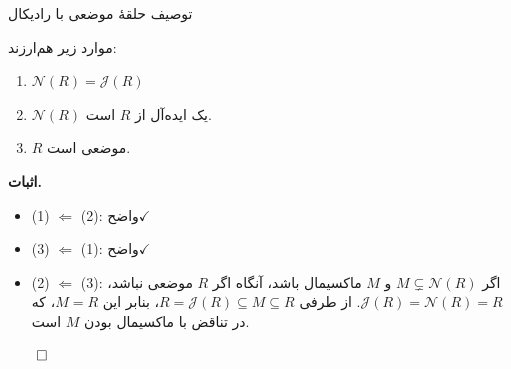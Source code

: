 \begin{frame}[t]{توصیف حلقهٔ موضعی با رادیکال}
    \begin{theorem}
        موارد زیر هم‌ارزند:
        \begin{enumerate}
            \item \(\mathcal{N}(R) = \mathcal{J}(R)\)
            \item \(\mathcal{N}(R)\) یک ایده‌آل از \(R\) است.
            \item \(R\) موضعی است.
        \end{enumerate}
    \end{theorem}

    \textbf{اثبات.}
    
        \begin{itemize}
            \item (1) $\Leftarrow$ (2):  واضح\(\checkmark\)
            \item (3) $\Leftarrow$ (1): واضح\( \checkmark\)
            \item (2) $\Leftarrow$ (3): اگر \( M \subsetneq \mathcal{N}(R) \) و \( M \) ماکسیمال باشد، آنگاه اگر \( R \) موضعی نباشد،
                  \( \mathcal{J}(R) = \mathcal{N}(R) = R\).
                  از طرفی
                  \(R = \mathcal{J}(R) \subseteq M \subseteq R\)،
                  بنابر این
                  \(M = R\)،
                  که در تناقض با ماکسیمال بودن
                  \(M\)
                  است.
        \end{itemize}

        \hfill \(\qed\)
\end{frame}